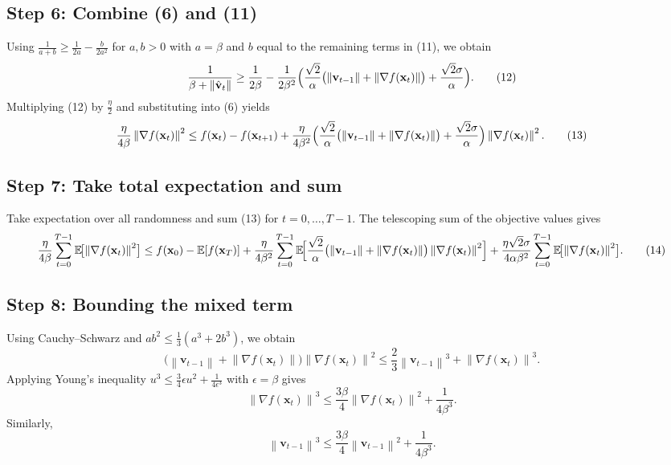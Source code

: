 \documentclass{article}
\newcommand{\E}{\mathbb{E}}
\newcommand{\norm}[1]{\left\|#1\right\|}
\newcommand{\grad}{\nabla}
\begin{document}
\subsection*{Step 6: Combine (6) and (11)}
Using $\frac{1}{a+b}\ge\frac{1}{2a} -\frac{b}{2a^{2}}$ for $a,b>0$ with $a=\beta$ and $b$ equal to the remaining terms in (11), we obtain
\[
\frac{1}{\beta+\norm{\hat{\mathbf{v}}_t}}
\ge \frac{1}{2\beta}
   -\frac{1}{2\beta^{2}}\Bigl(
        \frac{\sqrt{2}}{\alpha}\bigl(\norm{\mathbf{v}_{t-1}}+\norm{\grad f(\mathbf{x}_t)}\bigr)
        +\frac{\sqrt{2}\sigma}{\alpha}
      \Bigr).
\tag{12}
\]
Multiplying (12) by $\frac{\eta}{2}$ and substituting into (6) yields
\[
\frac{\eta}{4\beta}\norm{\grad f(\mathbf{x}_t)}^{2}
\le f(\mathbf{x}_t)-f(\mathbf{x}_{t+1})
+ \frac{\eta}{4\beta^{2}}
   \Bigl(
        \frac{\sqrt{2}}{\alpha}\bigl(\norm{\mathbf{v}_{t-1}}+\norm{\grad f(\mathbf{x}_t)}\bigr)
        +\frac{\sqrt{2}\sigma}{\alpha}
   \Bigr)
   \norm{\grad f(\mathbf{x}_t)}^{2}.
\tag{13}
\]

\subsection*{Step 7: Take total expectation and sum}
Take expectation over all randomness and sum (13) for $t=0,\dots,T-1$.
The telescoping sum of the objective values gives
\[
\frac{\eta}{4\beta}\sum_{t=0}^{T-1}\E\!\bigl[\norm{\grad f(\mathbf{x}_t)}^{2}\bigr]
\le f(\mathbf{x}_0)-\E[f(\mathbf{x}_T)]
+ \frac{\eta}{4\beta^{2}}\sum_{t=0}^{T-1}
   \E\!\Bigl[
        \frac{\sqrt{2}}{\alpha}
        \bigl(\norm{\mathbf{v}_{t-1}}+\norm{\grad f(\mathbf{x}_t)}\bigr)
        \norm{\grad f(\mathbf{x}_t)}^{2}
   \Bigr]
   +\frac{\eta\sqrt{2}\sigma}{4\alpha\beta^{2}}\sum_{t=0}^{T-1}
   \E\!\bigl[\norm{\grad f(\mathbf{x}_t)}^{2}\bigr].
\tag{14}
\]

\subsection*{Step 8: Bounding the mixed term}
Using Cauchy–Schwarz and $ab^{2}\le \frac{1}{3}(a^{3}+2b^{3})$, we obtain
\[
\bigl(\norm{\mathbf{v}_{t-1}}+\norm{\grad f(\mathbf{x}_t)}\bigr)
      \norm{\grad f(\mathbf{x}_t)}^{2}
\le \frac{2}{3}\norm{\mathbf{v}_{t-1}}^{3}
    +\norm{\grad f(\mathbf{x}_t)}^{3}.
\tag{15}
\]
Applying Young’s inequality $u^{3}\le \frac{3}{4}\epsilon u^{2}+ \frac{1}{4\epsilon^{3}}$ with $\epsilon= \beta$ gives
\[
\norm{\grad f(\mathbf{x}_t)}^{3}
\le \frac{3\beta}{4}\norm{\grad f(\mathbf{x}_t)}^{2}
    +\frac{1}{4\beta^{3}} .
\tag{16}
\]
Similarly,
\[
\norm{\mathbf{v}_{t-1}}^{3}
\le \frac{3\beta}{4}\norm{\mathbf{v}_{t-1}}^{2}
    +\frac{1}{4\beta^{3}} .
\tag{17}
\]
\end{document}
